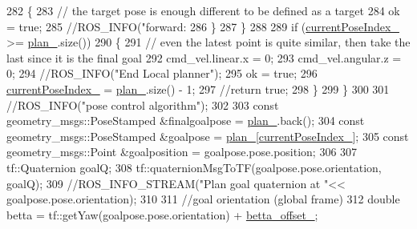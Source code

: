 \begin{DoxyCode}
282             \{
283                 \textcolor{comment}{// the target pose is enough different to be defined as a target}
284                 ok = \textcolor{keyword}{true};
285                 \textcolor{comment}{//ROS\_INFO("forward: %
286             \}
287         \}
288 
289         \textcolor{keywordflow}{if} (\hyperlink{classmove__base__z__client_1_1forward__local__planner_1_1ForwardLocalPlanner_a7033550f29cdac00cc997a3ce352dfd1}{currentPoseIndex\_} >= \hyperlink{classmove__base__z__client_1_1forward__local__planner_1_1ForwardLocalPlanner_a1c6191c999481e31fabd41f7a04041fe}{plan\_}.size())
290         \{
291             \textcolor{comment}{// even the latest point is quite similar, then take the last since it is the final goal}
292             cmd\_vel.linear.x = 0;
293             cmd\_vel.angular.z = 0;
294             \textcolor{comment}{//ROS\_INFO("End Local planner");}
295             ok = \textcolor{keyword}{true};
296             \hyperlink{classmove__base__z__client_1_1forward__local__planner_1_1ForwardLocalPlanner_a7033550f29cdac00cc997a3ce352dfd1}{currentPoseIndex\_} = \hyperlink{classmove__base__z__client_1_1forward__local__planner_1_1ForwardLocalPlanner_a1c6191c999481e31fabd41f7a04041fe}{plan\_}.size() - 1;
297             \textcolor{comment}{//return true;}
298         \}
299     \}
300 
301     \textcolor{comment}{//ROS\_INFO("pose control algorithm");}
302 
303     \textcolor{keyword}{const} geometry\_msgs::PoseStamped &finalgoalpose = \hyperlink{classmove__base__z__client_1_1forward__local__planner_1_1ForwardLocalPlanner_a1c6191c999481e31fabd41f7a04041fe}{plan\_}.back();
304     \textcolor{keyword}{const} geometry\_msgs::PoseStamped &goalpose = \hyperlink{classmove__base__z__client_1_1forward__local__planner_1_1ForwardLocalPlanner_a1c6191c999481e31fabd41f7a04041fe}{plan\_}[\hyperlink{classmove__base__z__client_1_1forward__local__planner_1_1ForwardLocalPlanner_a7033550f29cdac00cc997a3ce352dfd1}{currentPoseIndex\_}];
305     \textcolor{keyword}{const} geometry\_msgs::Point &goalposition = goalpose.pose.position;
306 
307     tf::Quaternion goalQ;
308     tf::quaternionMsgToTF(goalpose.pose.orientation, goalQ);
309     \textcolor{comment}{//ROS\_INFO\_STREAM("Plan goal quaternion at "<< goalpose.pose.orientation);}
310 
311     \textcolor{comment}{//goal orientation (global frame)}
312     \textcolor{keywordtype}{double} betta = tf::getYaw(goalpose.pose.orientation) + \hyperlink{classmove__base__z__client_1_1forward__local__planner_1_1ForwardLocalPlanner_a491ebf7d21303325b6751d8e9bf0aff9}{betta\_offset\_};
}
\end{DoxyCode}
